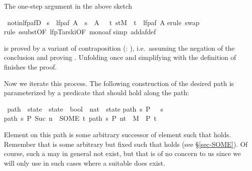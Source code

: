 \begin{isabellebody}
\begin{isamarkuptext}
The one-step argument in the above sketch%
\end{isamarkuptext}%
\ not{\isacharunderscore}in{\isacharunderscore}lfp{\isacharunderscore}afD{\isacharcolon}\isanewline
\ {\isachardoublequote}s\ {\isasymnotin}\ lfp{\isacharparenleft}af\ A{\isacharparenright}\ {\isasymLongrightarrow}\ s\ {\isasymnotin}\ A\ {\isasymand}\ {\isacharparenleft}{\isasymexists}\ t{\isachardot}\ {\isacharparenleft}s{\isacharcomma}t{\isacharparenright}{\isasymin}M\ {\isasymand}\ t\ {\isasymnotin}\ lfp{\isacharparenleft}af\ A{\isacharparenright}{\isacharparenright}{\isachardoublequote}\isanewline
{}erule\ swap{\isacharparenright}\isanewline
{}rule\ ssubst{\isacharbrackleft}OF\ lfp{\isacharunderscore}Tarski{\isacharbrackleft}OF\ mono{\isacharunderscore}af{\isacharbrackright}{\isacharbrackright}{\isacharparenright}\isanewline
{}simp\ add{\isacharcolon}af{\isacharunderscore}def{\isacharparenright}\isanewline
{}%
\begin{isamarkuptext}%
\noindent
is proved by a variant of contraposition (:
), i.e.\ assuming the negation of the conclusion
and proving . Unfolding  once and
simplifying with the definition of  finishes the proof.

Now we iterate this process. The following construction of the desired
path is parameterized by a predicate  that should hold along the path:%
\end{isamarkuptext}%
\ path\ {\isacharcolon}{\isacharcolon}\ {\isachardoublequote}state\ {\isasymRightarrow}\ {\isacharparenleft}state\ {\isasymRightarrow}\ bool{\isacharparenright}\ {\isasymRightarrow}\ {\isacharparenleft}nat\ {\isasymRightarrow}\ state{\isacharparenright}{\isachardoublequote}\isanewline
{}\isanewline
{\isachardoublequote}path\ s\ P\ \ {\isacharequal}\ s{\isachardoublequote}\isanewline
{\isachardoublequote}path\ s\ P\ {\isacharparenleft}Suc\ n{\isacharparenright}\ {\isacharequal}\ {\isacharparenleft}SOME\ t{\isachardot}\ {\isacharparenleft}path\ s\ P\ n{\isacharcomma}t{\isacharparenright}\ {\isasymin}\ M\ {\isasymand}\ P\ t{\isacharparenright}{\isachardoublequote}%
\begin{isamarkuptext}%
\noindent
Element  on this path is some arbitrary successor
 of element  such that  holds.  Remember that 
is some arbitrary but fixed  such that  holds (see \S\ref{sec-SOME}). Of
course, such a  may in general not exist, but that is of no
concern to us since we will only use  in such cases where a
suitable  does exist.


\end{isamarkuptext}
\end{isabellebody}
